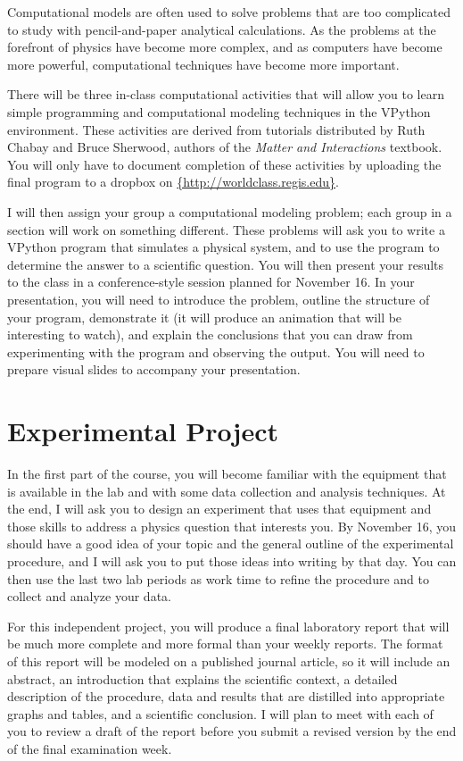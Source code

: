 \documentclass[11pt]{article}
\begin{document}
Computational models are often used to solve problems that are too
complicated to study with pencil-and-paper analytical calculations.
As the problems at the forefront of physics have become more complex,
and as computers have become more powerful, computational techniques have
become more important.

There will be three in-class computational activities that will allow you
to learn simple programming and computational modeling techniques in the 
VPython environment.  These activities are derived from tutorials distributed
by Ruth Chabay and Bruce Sherwood, authors of the {\em{Matter and Interactions}}
textbook.  You will only have to document completion of these activities
by uploading the final program to a dropbox on \url{{http://worldclass.regis.edu}}.

I will then assign your group a computational modeling problem; each 
group in a section will work on something different.  These problems 
will ask you to write a VPython program that simulates a physical system,
and to use the program to determine the answer to a scientific question.
You will then present your results to the class in a conference-style
session planned for November 16.
In your presentation, you will need to introduce the problem, outline the
structure of your program, demonstrate it (it will produce
an animation that will be interesting to watch), and explain the conclusions
that you can draw from experimenting with the program and observing the output.
You will need to prepare visual slides to accompany your presentation.

\section{Experimental Project}

In the first part of the course, you will become familiar with the equipment
that is available in the lab and with some data collection and analysis
techniques.  At the end, I will ask you to design an experiment that uses
that equipment and those skills to address a physics question that 
interests you.  By November 16, you should have a good idea of your topic
and the general outline of the experimental procedure, and I will ask you to 
put those ideas into writing by that day.  You can then use the last two lab 
periods as work time to refine the procedure and to collect and analyze
your data.  

For this independent project, you will produce a final laboratory report 
that will be much more complete and more formal than your weekly reports.
The format of this report will be modeled on a published journal article, 
so it will include an abstract, an introduction that explains the scientific 
context, a detailed description of the procedure, data and results that are 
distilled into appropriate graphs and tables, and a scientific conclusion.
I will plan to meet with each of you to review a draft of the report before
you submit a revised version by the end of the final examination week.
\end{document}
